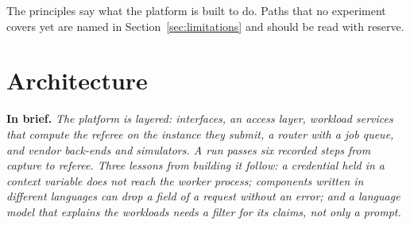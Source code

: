 \documentclass[11pt,a4paper]{article}
\newcommand{\inbrief}[1]{\par\smallskip\noindent\textbf{In brief.} \emph{#1}\par\medskip}
\begin{document}
The principles say what the platform is built to do. Paths that no
experiment covers yet are named in Section~\ref{sec:limitations} and should
be read with reserve.

\section{Architecture}
\label{sec:architecture}

\inbrief{The platform is layered: interfaces, an access layer, workload
services that compute the referee on the instance they submit, a router with
a job queue, and vendor back-ends and simulators. A run passes six recorded
steps from capture to referee. Three lessons from building it follow: a
credential held in a context variable does not reach the worker process;
components written in different languages can drop a field of a request
without an error; and a language model that explains the workloads needs a
filter for its claims, not only a prompt.}
\end{document}
